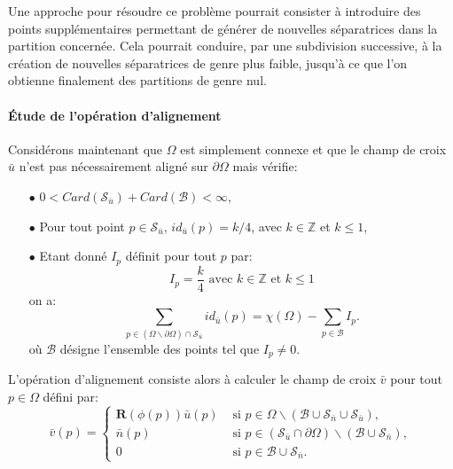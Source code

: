 Une approche pour résoudre ce problème pourrait consister à introduire des points supplémentaires permettant de générer de nouvelles séparatrices dans la partition concernée. Cela pourrait conduire, par une subdivision successive, à la création de nouvelles séparatrices de genre plus faible, jusqu'à ce que l'on obtienne finalement des partitions de genre nul.



\paragraph{\'Etude de l'opération d'alignement}

Considérons maintenant que $\Omega$ est simplement connexe et que le champ de croix $\bar{u}$ n'est pas nécessairement aligné sur $\partial\Omega$ mais vérifie:
\begin{itemize}
 \item[$\bullet$] $0< Card(\mathcal{S}_{\bar{u}})+Card(\mathcal{B})<\infty$,\\
 \item[$\bullet$] Pour tout point $p\in\mathcal{S}_{\bar{u}}$, $id_{\bar{u}}(p)=k/4$, avec $k\in\mathbb{Z}$ et $k\leq 1$,\\
 \item[$\bullet$] Etant donné $I_p$ définit pour tout $p$ par:
\begin{equation}
I_p=\displaystyle\frac{k}{4}\mbox{ avec }k\in\mathbb{Z}\mbox{ et }k\leq 1
\end{equation}
on a:
 \begin{equation}
    \label{eqn:principe_hypothese_u_space}
    \sum_{p\in(\Omega\backslash\partial\Omega)\cap\mathcal{S}_{\bar{u}}}id_{\bar{u}}(p)=\chi(\Omega)-\sum_{p\in\mathcal{B}}I_p.
\end{equation}
où $\mathcal{B}$ désigne l'ensemble des points tel que $I_p\neq 0$.\\
\end{itemize}
L'opération d'alignement consiste alors à calculer le champ de croix $\bar{v}$ pour tout $p\in\Omega$ défini par:
\begin{equation}
\bar{v}(p)=
\left\{
\begin{array}{ll}
\mathbf{R}(\phi(p))\bar{u}(p) & \mbox{ si } p\in\Omega\backslash(\mathcal{B}\cup\mathcal{S}_{\bar{n}}\cup\mathcal{S}_{\bar{u}}),\\[0.5cm]
\bar{n}(p) & \mbox{ si } p\in(\mathcal{S}_{\bar{u}}\cap\partial\Omega)\backslash(\mathcal{B}\cup\mathcal{S}_{\bar{n}}),\\[0.5cm]
0 & \mbox{ si } p\in\mathcal{B}\cup\mathcal{S}_{\bar{n}}.
\end{array}
\right.
\label{eqn:principe_def_v_space}
\end{equation}
